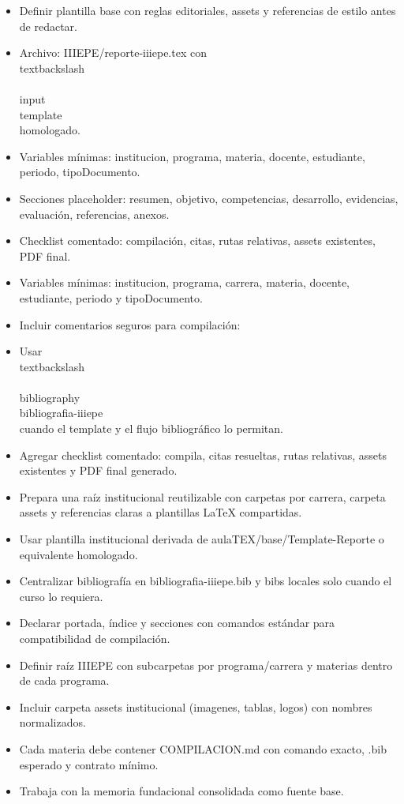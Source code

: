 \documentclass[12pt]{article}
\begin{document}
\begin{itemize}[leftmargin=*]
  \item Definir plantilla base con reglas editoriales, assets y referencias de estilo antes de redactar.
  \item Archivo: IIIEPE/reporte-iiiepe.tex con \\textbackslash\\{\\}input\\{template\\} homologado.
  \item Variables mínimas: institucion, programa, materia, docente, estudiante, periodo, tipoDocumento.
  \item Secciones placeholder: resumen, objetivo, competencias, desarrollo, evidencias, evaluación, referencias, anexos.
  \item Checklist comentado: compilación, citas, rutas relativas, assets existentes, PDF final.
  \item Variables mínimas: institucion, programa, carrera, materia, docente, estudiante, periodo y tipoDocumento.
  \item Incluir comentarios seguros para compilación: \\%
  \item Usar \\textbackslash\\{\\}bibliography\\{bibliografia-iiiepe\\} cuando el template y el flujo bibliográfico lo permitan.
  \item Agregar checklist comentado: compila, citas resueltas, rutas relativas, assets existentes y PDF final generado.
  \item Prepara una raíz institucional reutilizable con carpetas por carrera, carpeta assets y referencias claras a plantillas LaTeX compartidas.
  \item Usar plantilla institucional derivada de aulaTEX/base/Template-Reporte o equivalente homologado.
  \item Centralizar bibliografía en bibliografia-iiiepe.bib y bibs locales solo cuando el curso lo requiera.
  \item Declarar portada, índice y secciones con comandos estándar para compatibilidad de compilación.
  \item Definir raíz IIIEPE con subcarpetas por programa/carrera y materias dentro de cada programa.
  \item Incluir carpeta assets institucional (imagenes, tablas, logos) con nombres normalizados.
  \item Cada materia debe contener COMPILACION.md con comando exacto, .bib esperado y contrato mínimo.
  \item Trabaja con la memoria fundacional consolidada como fuente base.
\end{itemize}
\end{document}
